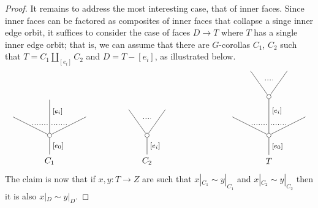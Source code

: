 \documentclass[a4paper,10pt]{article}%
\numberwithin{equation}{section}
\numberwithin{figure}{section}
\theoremstyle{definition} %
\newcommand{\1}{\ensuremath{\mathbbm 1}}%
\begin{document}
\begin{proof}
It remains to address the most interesting case,
that of inner faces. Since inner faces can be factored as composites of inner faces that collapse a singe inner edge orbit,
it suffices to consider the case of faces
$D \to T$ where $T$ has a single inner edge orbit; that is,
we can assume that there are $G$-corollas
$C_1$, $C_2$ such that 
$T = C_1 \amalg_{[e_i]} C_2$ and
$D = T - [e_i]$, as illustrated below.
\[
\begin{tikzpicture}
[grow=up,auto,level distance=3em,
every node/.style = {font=\footnotesize},
dummy/.style={circle,draw,inner sep=0pt,minimum size=1.75mm}]
	\node at (0,0) [font=\normalsize]{$C_1$}
		child{node [dummy] {}
			child[level distance=2.15em]{
			edge from parent node [swap,near end] {} node [inner sep=1pt,name=Kn] {}}
			child[level distance=4.5em]{node {}
			edge from parent node [pos=0.65,swap] {$[e_i]$}
node [near start,inner sep=1pt,name=Kone,swap] {}
node [near start,inner sep=1pt,name=Kone1] {}}
			child[level distance=2.15em]{
			edge from parent node [near end] {}
node [swap] {}
node [inner sep=1pt,name=Kn1,swap]{}}
		edge from parent node [swap] {$[e_0]$}
		};
		\draw [dotted,thick] (Kone) -- (Kn) ;
		\draw [dotted,thick] (Kone1) -- (Kn1) ;
	\node at (4,0) [font=\normalsize]{$C_2$}
		child{node [dummy] {}
			child{
			edge from parent node [swap,near end] {} node [name=Kn] {}}
			child{
			edge from parent node [near end] {}
node [name=Kone,swap] {}}
		edge from parent node [swap] {$[e_i]$}
		};
		\draw [dotted,thick] (Kone) -- (Kn) ;
	\node at (9,0) [font=\normalsize]{$T$}
		child{node [dummy] {}
			child[level distance=2.15em]{
			edge from parent node [swap,near end] {} node [inner sep=1pt,name=Kn] {}}
			child[level distance=4.5em]{node [dummy] {}
				child[level distance=3em]{
				edge from parent node [swap,near end] {} node [name=Kn2] {}}
				child[level distance=3em]{
				edge from parent node [near end] {}
node [name=Kone2,swap] {}}
			edge from parent node [pos=0.65,swap] {$[e_i]$}
node [near start,inner sep=1pt,name=Kone,swap] {}
node [near start,inner sep=1pt,name=Kone1] {}}
			child[level distance=2.15em]{
			edge from parent node [near end] {}
node [swap] {}
node [inner sep=1pt,name=Kn1,swap]{}}
		edge from parent node [swap] {$[e_0]$}
		};
		\draw [dotted,thick] (Kone) -- (Kn) ;
		\draw [dotted,thick] (Kone1) -- (Kn1) ;
		\draw [dotted,thick] (Kone2) -- (Kn2) ;
\end{tikzpicture}
\]
The claim is now that if
$x,y \colon T \to Z$ are such that
$x|_{C_1} \sim y|_{C_1}$ and
$x|_{C_2} \sim y|_{C_2}$
then it is also 
$x|_{D} \sim y|_{D}$.

\end{proof}
\end{document}
